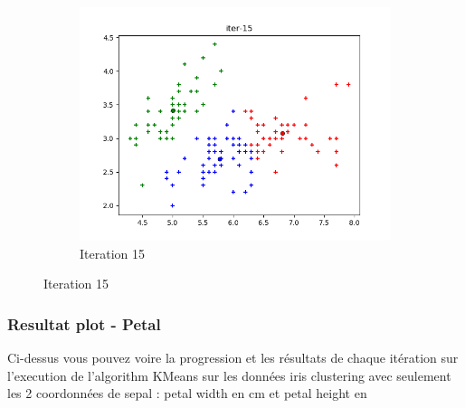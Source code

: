 \documentclass[french]{article}
\begin{document}
\begin{figure}[h!]
\centering
\begin{subfigure}{.5\textwidth}
  \centering
  \includegraphics[width=\linewidth]{img/iter-15.png}
  \caption{Iteration 15}
\end{subfigure}%
\end{figure}

\newpage
\subsubsection{Resultat plot - Petal}
Ci-dessus vous pouvez voire la progression et les résultats de chaque itération sur l'execution de l'algorithm KMeans sur les données iris clustering avec seulement les 2 coordonnées  de sepal : petal width en cm et petal height en 
\end{document}
